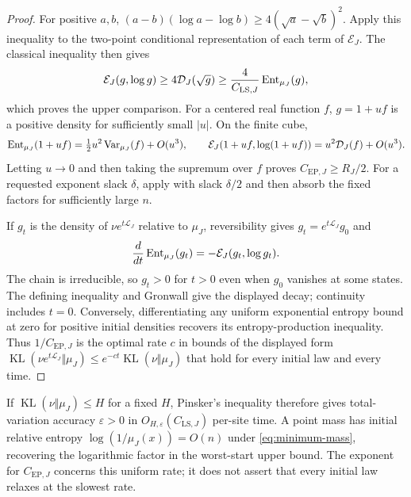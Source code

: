 \begin{proof}
For positive $a,b$,
$(a-b)(\log a-\log b)\ge4(\sqrt a-\sqrt b)^2$.
Apply this inequality to the two-point conditional representation of
each term of $\mathcal E_J$. The classical inequality then gives
\[
 \mathcal E_J(g,\log g)\ge4\mathcal D_J(\sqrt g)
 \ge\frac4{C_{\mathrm{LS},J}}\operatorname{Ent}_{\mu_J}(g),
\]
which proves the upper comparison. For a centered real function $f$,
$g=1+uf$ is a positive density for sufficiently small $|u|$. On the
finite cube,
\[
 \operatorname{Ent}_{\mu_J}(1+uf)=\tfrac12u^2\operatorname{Var}_{\mu_J}(f)+O(u^3),\qquad
 \mathcal E_J(1+uf,\log(1+uf))=u^2\mathcal D_J(f)+O(u^3).
\]
Letting $u\to0$ and then taking the supremum over $f$ proves
$C_{\mathrm{EP},J}\ge R_J/2$. For a requested exponent slack $\delta$,
apply  with slack $\delta/2$ and then absorb the fixed
factors for sufficiently large $n$.

If $g_t$ is the density of $\nu e^{t\mathcal L_J}$ relative to $\mu_J$,
reversibility gives $g_t=e^{t\mathcal L_J}g_0$ and
\[
 \frac{d}{dt}\operatorname{Ent}_{\mu_J}(g_t)
 =-\mathcal E_J(g_t,\log g_t).
\]
The chain is irreducible, so $g_t>0$ for $t>0$ even when $g_0$ vanishes
at some states. The defining inequality and Gronwall give the displayed
decay; continuity includes $t=0$. Conversely, differentiating any
uniform exponential entropy bound at zero for positive initial
densities recovers its entropy-production inequality. Thus
$1/C_{\mathrm{EP},J}$ is the optimal rate $c$ in bounds of the displayed
form $\operatorname{KL}(\nu e^{t\mathcal L_J}\Vert\mu_J)
\le e^{-ct}\operatorname{KL}(\nu\Vert\mu_J)$ that hold for every initial
law and every time.
\end{proof}

If $\operatorname{KL}(\nu\Vert\mu_J)\le H$ for a fixed $H$, Pinsker's
inequality therefore gives total-variation accuracy $\varepsilon>0$ in
$O_{H,\varepsilon}(C_{\mathrm{LS},J})$ per-site time. A point mass has initial
relative entropy $\log(1/\mu_J(x))=O(n)$ under
\eqref{eq:minimum-mass}, recovering the logarithmic factor in the
worst-start upper bound. The exponent for $C_{\mathrm{EP},J}$ concerns
this uniform rate; it does not assert that every initial law relaxes at
the slowest rate.
